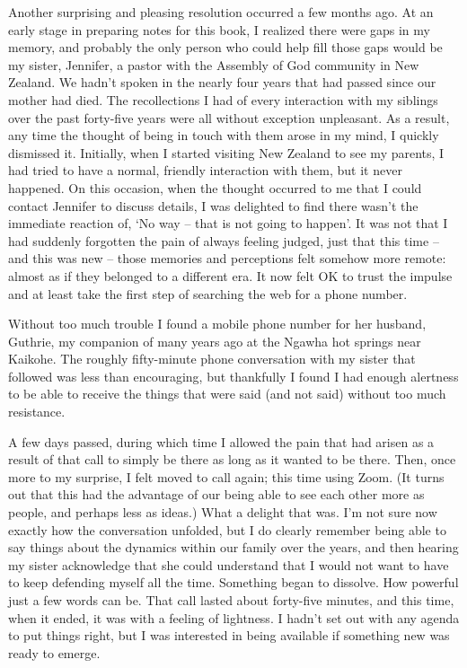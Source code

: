 Another surprising and pleasing resolution occurred a few months ago. At
an early stage in preparing notes for this book, I realized there were
gaps in my memory, and probably the only person who could help fill
those gaps would be my sister, Jennifer, a pastor with the Assembly of
God community in New Zealand. We hadn't spoken in the nearly four years
that had passed since our mother had died. The recollections I had of
every interaction with my siblings over the past forty-five years were
all without exception unpleasant. As a result, any time the thought of
being in touch with them arose in my mind, I quickly dismissed it.
Initially, when I started visiting New Zealand to see my parents, I had
tried to have a normal, friendly interaction with them, but it never
happened. On this occasion, when the thought occurred to me that I could
contact Jennifer to discuss details, I was delighted to find there
wasn't the immediate reaction of, `No way -- that is not going to
happen'. It was not that I had suddenly forgotten the pain of always
feeling judged, just that this time -- and this was new -- those
memories and perceptions felt somehow more remote: almost as if they
belonged to a different era. It now felt OK to trust the impulse and at
least take the first step of searching the web for a phone number.

Without too much trouble I found a mobile phone number for her husband,
Guthrie, my companion of many years ago at the Ngawha hot springs near
Kaikohe. The roughly fifty-minute phone conversation with my sister that
followed was less than encouraging, but thankfully I found I had enough
alertness to be able to receive the things that were said (and not said)
without too much resistance.

A few days passed, during which time I allowed the pain that had arisen
as a result of that call to simply be there as long as it wanted to be
there. Then, once more to my surprise, I felt moved to call again; this
time using Zoom.
(It turns out that this had the advantage of our being able to see each other
more as people, and perhaps less as ideas.)
What a delight that was. I'm not sure now exactly how the
conversation unfolded, but I do clearly remember being able to say
things about the dynamics within our family over the years, and then
hearing my sister acknowledge that she could understand that I would not
want to have to keep defending myself all the time. Something began to
dissolve. How powerful just a few words can be. That call lasted about
forty-five minutes, and this time, when it ended, it was with a feeling
of lightness. I hadn't set out with any agenda to put things right, but
I was interested in being available if something new was ready to
emerge.

